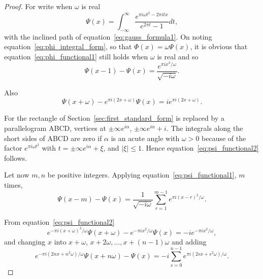\documentclass[12pt]{article}
\theoremstyle{remark}
\begin{document}
\begin{proof}
For write when $\omega$ is real
\begin{equation}\label{eq:psi_definition}
\Psi(x) = \int_{-\infty}^\infty \frac{e^{\pi i\omega t^2 - 2\pi itx}}{e^{2\pi t} - 1} dt,
\end{equation}
with the inclined path of equation~\eqref{eq:gauss_formula1}. On noting equation~\eqref{eq:phi_integral_form}, so that $\Phi(x) = \omega \Psi(x)$, it is obvious that equation~\eqref{eq:phi_functional1} still holds when $\omega$ is real and so
\begin{equation}\label{eq:psi_functional1}
\Psi(x - 1) - \Psi(x) = \frac{e^{\pi ix^2/\omega}}{\sqrt{-i\omega}}.
\end{equation}

Also
\begin{equation}\label{eq:psi_functional2}
\Psi(x + \omega) - e^{\pi i(2x+\omega)} \Psi(x) = ie^{\pi i(2x+\omega)}.
\end{equation}

For the rectangle of Section~\ref{sec:first_standard_form} is replaced by a parallelogram ABCD, vertices at $\pm \infty e^{i\alpha}$, $\pm \infty e^{i\alpha} + i$. The integrals along the short sides of ABCD are zero if $\alpha$ is an acute angle with $\omega > 0$ because of the factor $e^{\pi i\omega t^2}$ with $t = \pm \infty e^{i\alpha} + \xi$, and $|\xi| \leq 1$. Hence equation~\eqref{eq:psi_functional2} follows.

Let now $m, n$ be positive integers. Applying equation~\eqref{eq:psi_functional1}, $m$ times,
\begin{equation}\label{eq:psi_iteration1}
\Psi(x-m) - \Psi(x) = \frac{1}{\sqrt{-i\omega}} \sum_{r=1}^{m-1} e^{\pi i(x-r)^2/\omega}.
\end{equation}

From equation~\eqref{eq:psi_functional2}
\begin{equation}\label{eq:psi_transformation}
e^{-\pi i(x+\omega)^2/\omega} \Psi(x + \omega) - e^{-\pi ix^2/\omega} \Psi(x) = -ie^{-\pi ix^2/\omega},
\end{equation}
and changing $x$ into $x + \omega$, $x + 2\omega, \ldots, x + (n-1)\omega$ and adding
\begin{equation}\label{eq:psi_iteration2}
e^{-\pi i(2nx+n^2\omega)/\omega} \Psi(x + n\omega) - \Psi(x) = -i \sum_{s=0}^{n-1} e^{\pi i(2sx+s^2\omega)/\omega}.
\end{equation}


\end{proof}
\end{document}
